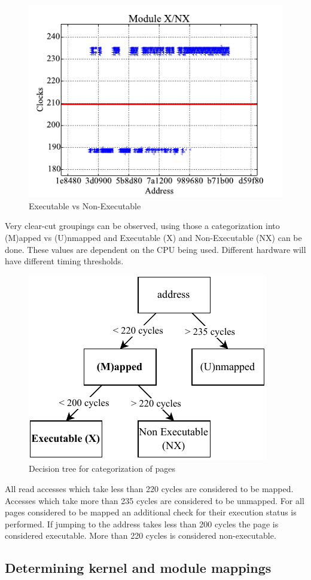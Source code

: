 \begin{figure}[h]
  \begin{center}
    \includegraphics[page=1,width=.4\textwidth]{fig/prebuilt_results_X_NX}
  \end{center}
  \caption{Executable vs Non-Executable \cite[Figure~6]{drk}}
  \label{fig:timing_x_nx}
\end{figure}

Very clear-cut groupings can be observed, using those a categorization into (M)apped vs (U)nmapped and Executable (X) and Non-Executable (NX) can be done.
These values are dependent on the CPU being used. Different hardware will have different timing thresholds.

\begin{figure}[h]
  \begin{center}
    \includegraphics[page=1,width=.4\textwidth]{fig/prebuilt_decision_tree}
  \end{center}
  \caption{Decision tree for categorization of pages}
  \label{fig:decision_tree}
\end{figure}

All read accesses which take less than 220 cycles are considered to be mapped.
Accesses which take more than 235 cycles are considered to be unmapped.
For all pages considered to be mapped an additional check for their execution status is performed.
If jumping to the address takes less than 200 cycles the page is considered executable.
More than 220 cycles is considered non-executable.

\subsection{Determining kernel and module mappings}

